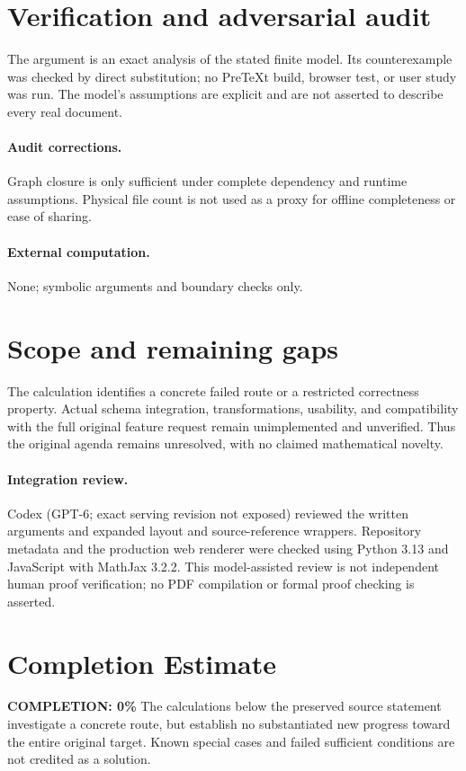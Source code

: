 \documentclass[11pt]{article}
\begin{document}
\section{Verification and adversarial audit}
The argument is an exact analysis of the stated finite model. Its counterexample was checked by direct substitution; no PreTeXt build, browser test, or user study was run. The model's assumptions are explicit and are not asserted to describe every real document.
\paragraph{Audit corrections.} Graph closure is only sufficient under complete dependency and runtime assumptions. Physical file count is not used as a proxy for offline completeness or ease of sharing.
\paragraph{External computation.} None; symbolic arguments and boundary checks only.
\section{Scope and remaining gaps}
The calculation identifies a concrete failed route or a restricted correctness property. Actual schema integration, transformations, usability, and compatibility with the full original feature request remain unimplemented and unverified. Thus the original agenda remains unresolved, with no claimed mathematical novelty.
\paragraph{Integration review.} Codex (GPT-6; exact serving revision not exposed) reviewed the written arguments and expanded layout and source-reference wrappers. Repository metadata and the production web renderer were checked using Python 3.13 and JavaScript with MathJax 3.2.2. This model-assisted review is not independent human proof verification; no PDF compilation or formal proof checking is asserted.

\section{Completion Estimate}
\noindent\textbf{COMPLETION: 0\%}
The calculations below the preserved source statement investigate a concrete route,
but establish no substantiated new progress toward the entire original target.
Known special cases and failed sufficient conditions are not credited as a solution.
\end{document}
